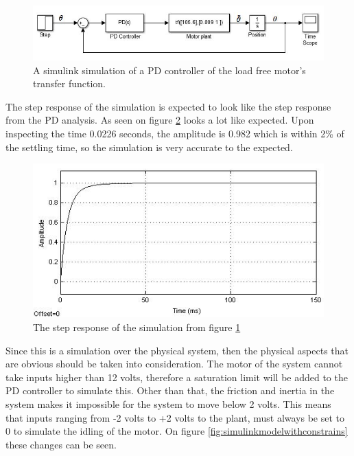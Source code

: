 \begin{figure}[h!]
\centering
\includegraphics[scale=0.7]{Billeder/simulinkmodel.jpg}
\caption{ A simulink simulation of a PD controller of the load free motor’s transfer function. }
\label{fig:Simulinkmodel}
\end{figure}

The step response of the simulation is expected to look like the step response from the PD analysis. As seen on figure \ref{fig:SimuStepPDNoConstrains} looks a lot like expected. Upon inspecting the time 0.0226 seconds, the amplitude is 0.982 which is within 2\% of the settling time, so the simulation is very accurate to the expected.

\begin{figure}[h!]
\centering
\includegraphics[scale=0.7]{Billeder/SimuStepPDNoConstrains.jpg}
\caption{ The step response of the simulation from figure \ref{fig:Simulinkmodel} }
\label{fig:SimuStepPDNoConstrains}
\end{figure}

Since this is a simulation over the physical system, then the physical aspects that are obvious should be taken into consideration. The motor of the system cannot take inputs higher than 12 volts, therefore a saturation limit will be added to the PD controller to simulate this. Other than that, the friction and inertia in the system makes it impossible for the system to move below 2 volts. This means that inputs ranging from -2 volts to +2 volts to the plant, must always be set to 0 to simulate the idling of the motor. On figure \ref{fig:simulinkmodelwithconstrains} these changes can be seen.


